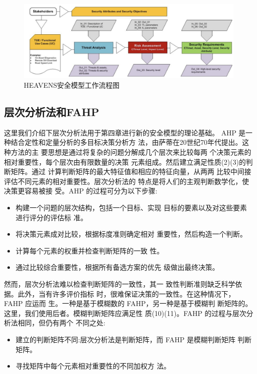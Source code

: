 \begin{figure}
    \centering
    \includegraphics[scale=0.6]{resources/img/i11.png}
    \caption{HEAVENS安全模型工作流程图}
  \end{figure}

  \subsection{层次分析法和FAHP}
  这里我们介绍下层次分析法用于第四章进行新的安全模型的理论基础。
  AHP 是一种结合定性和定量分析的多目标决策分析方
法，由萨蒂在20世纪70年代提出\cite{saaty1990make}。这种方法的主
要思想是通过将复杂的问题分解成几个层次来比较每两
个决策元素的相对重要性，每个层次由有限数量的决策
元素组成。然后建立满足性质(2)(3)的判断矩阵。通过
计算判断矩阵的最大特征值和相应的特征向量，从两两
比较中间接评估不同元素的相对重要性。层次分析法的
特点是将人们的主观判断数学化，使决策更容易被接
受。AHP 的过程可分为以下步骤:
\begin{itemize}
  \item  构建一个问题的层次结构，包括一个目标、实现
  目标的要素以及对这些要素进行评分的评估标
  准。
  \item  将决策元素成对比较，根据标度准则确定相对
  重要性，然后构造一个判断。
  \item  计算每个元素的权重并检查判断矩阵的一致
  性。
  \item 通过比较综合重要性，根据所有备选方案的优先
  级做出最终决策。
\end{itemize}

然而，层次分析法难以检查判断矩阵的一致性，其一
致性判断准则缺乏科学依据。此外，当有许多评价指标
时，很难保证决策的一致性。在这种情况下，FAHP 应运而
生\cite{min1997fuzzy}。一种是基于模糊数的 FAHP，另一种是基于模糊判
断矩阵的。这里，我们使用后者。模糊判断矩阵应满足性
质(10)(11)。FAHP 的过程与层次分析法相同，但仍有两个
不同之处:
\begin{itemize}
  \item  建立的判断矩阵不同:层次分析法是判断矩阵，而
  FAHP 是模糊判断矩阵
  判断矩阵。
  \item  寻找矩阵中每个元素相对重要性的不同加权方
  法。
\end{itemize}


